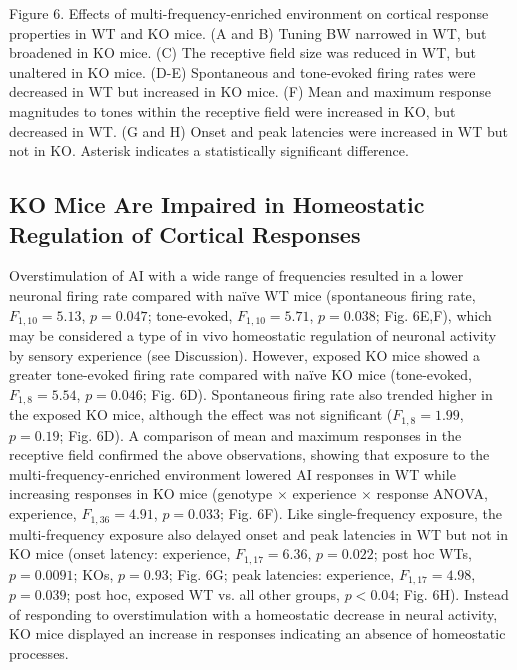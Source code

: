 \begin{changemargin}{1in}{1in}
\footnotesize{Figure 6. Effects of multi-frequency-enriched environment on cortical response properties in WT and KO mice. (A and B) Tuning BW narrowed in WT, but broadened in KO mice. (C) The receptive field size was reduced in WT, but unaltered in KO mice. (D-E) Spontaneous and tone-evoked firing rates were decreased in WT but increased in KO mice. (F) Mean and maximum response magnitudes to tones within the receptive field were increased in KO, but decreased in WT. (G and H) Onset and peak latencies were increased in WT but not in KO. Asterisk indicates a statistically significant difference.}
\end{changemargin}


\subsection{KO Mice Are Impaired in Homeostatic Regulation of Cortical Responses}

Overstimulation of AI with a wide range of frequencies resulted in a lower neuronal firing rate compared with na\"ive WT mice (spontaneous firing rate, $F_{1,10}=5.13$, $p=0.047$; tone-evoked, $F_{1,10}=5.71$, $p=0.038$; Fig. 6E,F), which may be considered a type of in vivo homeostatic regulation of neuronal activity by sensory experience (see Discussion). However, exposed KO mice showed a greater tone-evoked firing rate compared with na\"ive KO mice (tone-evoked, $F_{1,8}=5.54$, $p=0.046$; Fig. 6D). Spontaneous firing rate also trended higher in the exposed KO mice, although the effect was not significant ($F_{1,8}=1.99$, $p=0.19$; Fig. 6D). A comparison of mean and maximum responses in the receptive field confirmed the above observations, showing that exposure to the multi-frequency-enriched environment lowered AI responses in WT while increasing responses in KO mice (genotype $\times$ experience $\times$ response ANOVA, experience, $F_{1,36}=4.91$, $p=0.033$; Fig. 6F). Like single-frequency exposure, the multi-frequency exposure also delayed onset and peak latencies in WT but not in KO mice (onset latency: experience, $F_{1,17}=6.36$, $p=0.022$; post hoc WTs, $p=0.0091$; KOs, $p=0.93$; Fig. 6G; peak latencies: experience, $F_{1,17}=4.98$, $p=0.039$; post hoc, exposed WT vs. all other groups, $p<0.04$; Fig. 6H). Instead of responding to overstimulation with a homeostatic decrease in neural activity, KO mice displayed an increase in responses indicating an absence of homeostatic processes.

